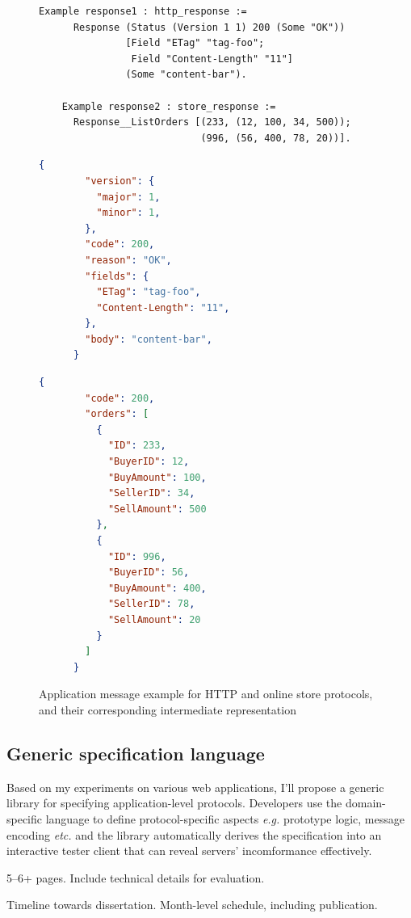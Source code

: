 \documentclass{article}
\begin{document}
\begin{figure}
  \begin{lstlisting}[style=customcoq]
    Example response1 : http_response :=
      Response (Status (Version 1 1) 200 (Some "OK"))
               [Field "ETag" "tag-foo";
                Field "Content-Length" "11"]
               (Some "content-bar").

    Example response2 : store_response :=
      Response__ListOrders [(233, (12, 100, 34, 500));
                            (996, (56, 400, 78, 20))].
  \end{lstlisting}
  \begin{minipage}[t]{.4\textwidth}
    \begin{lstlisting}[language=json]
      {
        "version": {
          "major": 1,
          "minor": 1,
        },
        "code": 200,
        "reason": "OK",
        "fields": {
          "ETag": "tag-foo",
          "Content-Length": "11",
        },
        "body": "content-bar",
      }
    \end{lstlisting}
  \end{minipage}%
  \begin{minipage}[t]{.4\textwidth}
    \begin{lstlisting}[language=json]
      {
        "code": 200,
        "orders": [
          {
            "ID": 233,
            "BuyerID": 12,
            "BuyAmount": 100,
            "SellerID": 34,
            "SellAmount": 500
          },
          {
            "ID": 996,
            "BuyerID": 56,
            "BuyAmount": 400,
            "SellerID": 78,
            "SellAmount": 20
          }
        ]
      }
    \end{lstlisting}
  \end{minipage}
  \caption{Application message example for HTTP and online store protocols, and
    their corresponding intermediate representation}
\end{figure}

\subsection{Generic specification language}
Based on my experiments on various web applications, I'll propose a generic
library for specifying application-level protocols.  Developers use the
domain-specific language to define protocol-specific aspects {\it e.g.}
prototype logic, message encoding {\it etc.}  and the library automatically
derives the specification into an interactive tester client that can reveal
servers' incomformance effectively.

5--6+ pages.  Include technical details for evaluation.

Timeline towards dissertation.  Month-level schedule, including publication.

\printbibliography
\end{document}
